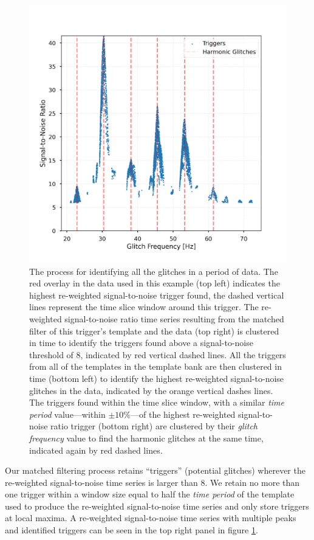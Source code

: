 \begin{figure}
\begin{minipage}[t]{1.0\linewidth}
        \hspace{0.01\linewidth}
        \includegraphics[width=0.49\linewidth]{images/4_archenemy/Section3/3.5/cluster_in_frequency.pdf}
      \end{minipage}
    \caption{The process for identifying all the \scl{} glitches in a period of \gw{} data. The red overlay in the \gw{} data used in this example (top left) indicates the highest re-weighted signal-to-noise trigger found, the dashed vertical lines represent the time slice window around this trigger. The re-weighted signal-to-noise ratio time series resulting from the matched filter of this trigger's template and the data (top right) is clustered in time to identify the triggers found above a signal-to-noise threshold of $8$, indicated by red vertical dashed lines. All the triggers from all of the templates in the template bank are then clustered in time (bottom left) to identify the highest re-weighted signal-to-noise glitches in the data, indicated by the orange vertical dashes lines. The triggers found within the time slice window, with a similar \emph{time period} value---within $\pm 10\%$---of the highest re-weighted signal-to-noise ratio trigger (bottom right) are clustered by their \emph{glitch frequency} value to find the harmonic glitches at the same time, indicated again by red dashed lines.}
    \label{4:fig:clustering_story}
\end{figure}

Our matched filtering process retains ``triggers'' (potential \scl{} glitches) wherever the re-weighted signal-to-noise time series is larger than 8. We retain no more than one trigger within a window size equal to half the \emph{time period} of the template used to produce the re-weighted signal-to-noise time series and only store triggers at local maxima. A re-weighted signal-to-noise time series with multiple peaks and identified triggers can be seen in the top right panel in figure \ref{4:fig:clustering_story}.

